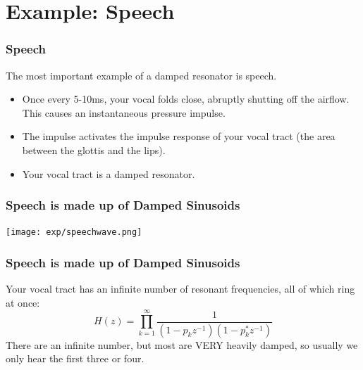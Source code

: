 \documentclass{beamer}
\begin{document}
\section[Speech]{Example: Speech}
\setcounter{subsection}{1}

\begin{frame}
  \frametitle{Speech}

  The most important example of a damped resonator is speech.
  \begin{itemize}
  \item Once every 5-10ms, your vocal folds close, abruptly shutting
    off the airflow.  This causes an instantaneous pressure impulse.
  \item The impulse activates the impulse response of your vocal tract
    (the area between the glottis and the lips).
  \item Your vocal tract is a damped resonator.
  \end{itemize}
\end{frame}

\begin{frame}
  \frametitle{Speech is made up of Damped Sinusoids}

  \centerline{\texttt{[image: exp/speechwave.png]}}
\end{frame}

\begin{frame}
  \frametitle{Speech is made up of Damped Sinusoids}

  Your vocal tract has an infinite number of resonant frequencies, all
  of which ring at once:
  \[
  H(z)  = \prod_{k=1}^\infty \frac{1}{(1-p_kz^{-1})(1-p_k^*z^{-1})}
  \]
  There are an infinite number, but most are VERY heavily damped, so
  usually we only hear the first three or four.
\end{frame}

\end{document}
